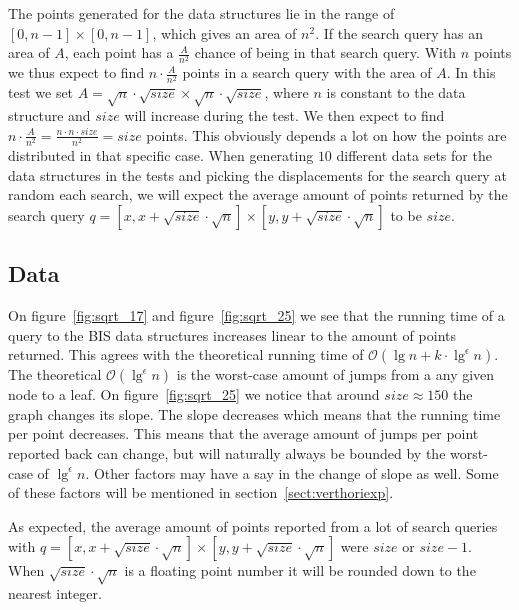 The points generated for the data structures lie in the range of $[0,n-1] \times [0,n-1]$, which gives an area of $n^2$. If the search query has an area of $A$, each point has a $\frac{A}{n^2}$ chance of being in that search query. With $n$ points we thus expect to find $n\cdot \frac{A}{n^2}$ points in a search query with the area of $A$. In this test we set $A = \sqrt{n}\cdot\sqrt{size}\times\sqrt{n}\cdot\sqrt{size}$, where $n$ is constant to the data structure and $size$ will increase during the test. We then expect to find $n\cdot\frac{A}{n^2} = \frac{n\cdot n \cdot size}{n^2} = size$ points. This obviously depends a lot on how the points are distributed in that specific case. When generating $10$ different data sets for the data structures in the tests and picking the displacements for the search query at random each search, we will expect the average amount of points returned by the search query $q = [x, x+\sqrt{size}\cdot\sqrt{n}] \times [y, y+\sqrt{size}\cdot\sqrt{n}]$ to be $size$.

\subsection{Data}

On figure~\ref{fig:sqrt_17} and figure~\ref{fig:sqrt_25} we see that the running time of a query to the BIS data structures increases linear to the amount of points returned. This agrees with the theoretical running time of $\mathcal{O}(\lg n + k\cdot \lg^\epsilon n)$. The theoretical $\mathcal{O}(\lg^\epsilon n)$ is the worst-case amount of jumps from a any given node to a leaf. On figure~\ref{fig:sqrt_25} we notice that around $size\approx 150$ the graph changes its slope. The slope decreases which means that the running time per point decreases. This means that the average amount of jumps per point reported back can change, but will naturally always be bounded by the worst-case of $\lg^\epsilon n$. Other factors may have a say in the change of slope as well. Some of these factors will be mentioned in section~\ref{sect:verthoriexp}.

\noindent As expected, the average amount of points reported from a lot of search queries with $q = [x, x + \sqrt{size}\cdot\sqrt{n}] \times [y, y + \sqrt{size}\cdot\sqrt{n}]$ were $size$ or $size-1$. When $\sqrt{size}\cdot\sqrt{n}$ is a floating point number it will be rounded down to the nearest integer. \\

